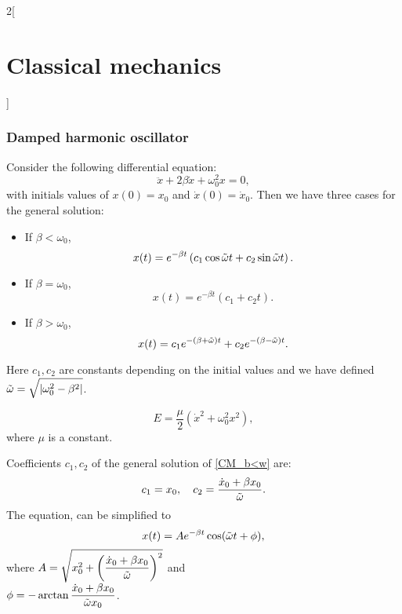 \documentclass[../../../main.tex]{subfiles}
\begin{document}
\begin{multicols}{2}[\section{Classical mechanics}]
  \subsubsection{Damped harmonic oscillator}
  \begin{prop}
    Consider the following differential equation: $$\ddot{x}+2\beta\dot{x}+\omega_0^2 x=0,$$ with initials values of $x(0)=x_0$ and $\dot{x}(0)=\dot{x}_0$. Then we have three cases for the general solution:
    \begin{itemize}
      \item If $\beta<\omega_0$,
            \begin{equation}
              x(t)=e^{-\beta t}\left(c_1\cos\Tilde{\omega}t+c_2\sin\Tilde{\omega}t\right).
              \label{CM_b<w}
            \end{equation}
      \item If $\beta=\omega_0$,
            \begin{equation}
              x(t)=e^{-\beta t}\left(c_1+c_2t\right).
              \label{CM_b=w}
            \end{equation}
      \item If $\beta>\omega_0$,
            \begin{equation}
              x(t)=c_1e^{-(\beta+\Tilde{\omega})t}+c_2e^{-(\beta-\Tilde{\omega})t}.
              \label{CM_b>w}
            \end{equation}
    \end{itemize}
    Here $c_1,c_2$ are constants depending on the initial values and we have defined $\displaystyle \Tilde{\omega}=\sqrt{\left|\omega_0^2-\beta^2\right|}$.
  \end{prop}
  \begin{prop}
    $$E=\frac{\mu}{2}\left(\dot{x}^2+\omega_0^2x^2\right),$$ where $\mu$ is a constant.
  \end{prop}
  \begin{prop}
    Coefficients $c_1,c_2$ of the general solution of \cref{CM_b<w} are: $$c_1=x_0,\quad c_2=\frac{\dot{x}_0+\beta x_0}{\Tilde{\omega}}.$$ The equation, can be simplified to $$x(t)=Ae^{-\beta t}\cos(\Tilde{\omega}t+\phi),$$ where $\displaystyle A=\sqrt{x_0^2+\left(\frac{\dot{x}_0+\beta x_0}{\Tilde{\omega}}\right)^2}$ and\\ $\displaystyle\phi=-\arctan\frac{\dot{x}_0+\beta x_0}{\Tilde{\omega}x_0}$.
  \end{prop}
  \begin{definition}

\end{definition}
\end{multicols}
\end{document}
